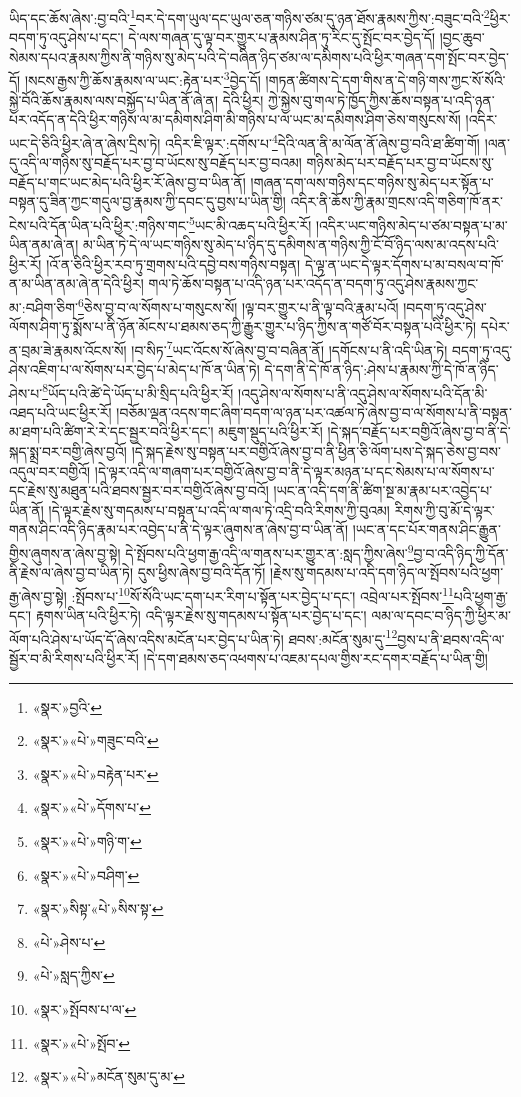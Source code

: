 ཡིད་དང་ཆོས་ཞེས་:བྱ་བའི་\footnote{«སྣར་»བྱའི་}བར་དེ་དག་ཡུལ་དང་ཡུལ་ཅན་གཉིས་ཙམ་དུ་ཉན་ཐོས་རྣམས་ཀྱིས་:བཟུང་བའི་\footnote{«སྣར་»«པེ་»གཟུང་བའི་}ཕྱིར་བདག་ཏུ་འདུ་ཤེས་པ་དང་། དེ་ལས་གཞན་དུ་ལྟ་བར་གྱུར་པ་རྣམས་ཤིན་ཏུ་རིང་དུ་སྤོང་བར་བྱེད་དོ། །བྱང་ཆུབ་སེམས་དཔའ་རྣམས་ཀྱིས་ནི་གཉིས་སུ་མེད་པའི་དེ་བཞིན་ཉིད་ཙམ་ལ་དམིགས་པའི་ཕྱིར་གཞན་དག་སྤོང་བར་བྱེད་དོ། །སངས་རྒྱས་ཀྱི་ཆོས་རྣམས་ལ་ཡང་:རྟེན་པར་\footnote{«སྣར་»«པེ་»བརྟེན་པར་}བྱེད་དོ། །གཏན་ཚིགས་དེ་དག་གིས་ན་དེ་གཉི་གས་ཀྱང་སོ་སོའི་སྐྱེ་བོའི་ཆོས་རྣམས་ལས་བསྐྱོད་པ་ཡིན་ནོ་ཞེ་ན། དེའི་ཕྱིར། ཀྱེ་སྐྱེས་བུ་གལ་ཏེ་ཁྱོད་ཀྱིས་ཆོས་བསྟན་པ་འདི་ཉན་པར་འདོད་ན་དེའི་ཕྱིར་གཉིས་ལ་མ་དམིགས་ཤིག་མི་གཉིས་པ་ལ་ཡང་མ་དམིགས་ཤིག་ཅེས་གསུངས་སོ། །འདིར་ཡང་དེ་ཅིའི་ཕྱིར་ཞེ་ན་ཞེས་དྲིས་ཏེ། འདིར་ཇི་ལྟར་:དགོས་པ་\footnote{«སྣར་»«པེ་»དོགས་པ་}དེའི་ལན་ནི་མ་ལོན་ནོ་ཞེས་བྱ་བའི་ཐ་ཚིག་གོ། །ལན་དུ་འདི་ལ་གཉིས་སུ་བརྗོད་པར་བྱ་བ་ཡོངས་སུ་བརྗོད་པར་བྱ་བའམ། གཉིས་མེད་པར་བརྗོད་པར་བྱ་བ་ཡོངས་སུ་བརྗོད་པ་གང་ཡང་མེད་པའི་ཕྱིར་རོ་ཞེས་བྱ་བ་ཡིན་ནོ། །གཞན་དག་ལས་གཉིས་དང་གཉིས་སུ་མེད་པར་སྟོན་པ་བསྟན་དུ་ཟིན་ཀྱང་གདུལ་བྱ་རྣམས་ཀྱི་དབང་དུ་བྱས་པ་ཡིན་གྱི། འདིར་ནི་ཆོས་ཀྱི་རྣམ་གྲངས་འདི་གཅིག་ཁོ་ནར་ངེས་པའི་དོན་ཡིན་པའི་ཕྱིར་:གཉིས་གང་\footnote{«སྣར་»«པེ་»གཉི་ག་}ཡང་མི་འཆད་པའི་ཕྱིར་རོ། །འདིར་ཡང་གཉིས་མེད་པ་ཙམ་བསྟན་པ་མ་ཡིན་ནམ་ཞེ་ན། མ་ཡིན་ཏེ་དེ་ལ་ཡང་གཉིས་སུ་མེད་པ་ཉིད་དུ་དམིགས་ན་གཉིས་ཀྱི་ངོ་བོ་ཉིད་ལས་མ་འདས་པའི་ཕྱིར་རོ། །འོ་ན་ཅིའི་ཕྱིར་རབ་ཏུ་གྲགས་པའི་དབྱེ་བས་གཉིས་བསྟན། དེ་ལྟ་ན་ཡང་དེ་ལྟར་དོགས་པ་མ་བསལ་བ་ཁོ་ན་མ་ཡིན་ནམ་ཞེ་ན་དེའི་ཕྱིར། གལ་ཏེ་ཆོས་བསྟན་པ་འདི་ཉན་པར་འདོད་ན་བདག་ཏུ་འདུ་ཤེས་རྣམས་ཀྱང་མ་:བཤིག་ཅིག་\footnote{«སྣར་»«པེ་»བཤིག་}ཅེས་བྱ་བ་ལ་སོགས་པ་གསུངས་སོ། །ལྟ་བར་གྱུར་པ་ནི་ལྟ་བའི་རྣམ་པའོ། །བདག་ཏུ་འདུ་ཤེས་ལོགས་ཤིག་ཏུ་སྨོས་པ་ནི་ཉོན་མོངས་པ་ཐམས་ཅད་ཀྱི་རྒྱུར་གྱུར་པ་ཉིད་ཀྱིས་ན་གཙོ་བོར་བསྟན་པའི་ཕྱིར་ཏེ། དཔེར་ན་བྲམ་ཟེ་རྣམས་འོངས་སོ། །བ་སིཏ་\footnote{«སྣར་»སིསྟ་«པེ་»སིས་སྟ་}ཡང་འོངས་སོ་ཞེས་བྱ་བ་བཞིན་ནོ། །དགོངས་པ་ནི་འདི་ཡིན་ཏེ། བདག་ཏུ་འདུ་ཤེས་འཇིག་པ་ལ་སོགས་པར་བྱེད་པ་མེད་པ་ཁོ་ན་ཡིན་ཏེ། དེ་དག་ནི་དེ་ཁོ་ན་ཉིད་:ཤེས་པ་རྣམས་ཀྱི་དེ་ཁོ་ན་ཉིད་ཤེས་པ་\footnote{«པེ་»ཤེས་པ་}ཡོད་པའི་ཚེ་དེ་ཡོད་པ་མི་སྲིད་པའི་ཕྱིར་རོ། །འདུ་ཤེས་ལ་སོགས་པ་ནི་འདུ་ཤེས་ལ་སོགས་པའི་དོན་མི་འཐད་པའི་ཡང་ཕྱིར་རོ། །བཅོམ་ལྡན་འདས་གང་ཞིག་བདག་ལ་ཉན་པར་འཚལ་ཏེ་ཞེས་བྱ་བ་ལ་སོགས་པ་ནི་བསྟན་མ་ཐག་པའི་ཚིག་རེ་རེ་དང་སྦྱར་བའི་ཕྱིར་དང་། མཇུག་སྡུད་པའི་ཕྱིར་རོ། །དེ་སྐད་བརྗོད་པར་བགྱིའོ་ཞེས་བྱ་བ་ནི་དེ་སྐད་སྨྲ་བར་བགྱི་ཞེས་བྱའོ། །དེ་སྐད་རྗེས་སུ་བསྟན་པར་བགྱིའོ་ཞེས་བྱ་བ་ནི་ཕྱིན་ཅི་ལོག་པས་དེ་སྐད་ཅེས་བྱ་བས་འདུལ་བར་བགྱིའོ། །དེ་ལྟར་འདི་ལ་གཞག་པར་བགྱིའོ་ཞེས་བྱ་བ་ནི་དེ་ལྟར་མཉན་པ་དང་སེམས་པ་ལ་སོགས་པ་དང་རྗེས་སུ་མཐུན་པའི་ཐབས་སྦྱར་བར་བགྱིའོ་ཞེས་བྱ་བའོ། །ཡང་ན་འདི་དག་ནི་ཚིག་སྔ་མ་རྣམ་པར་འབྱེད་པ་ཡིན་ནོ། །དེ་ལྟར་རྗེས་སུ་གདམས་པ་བསྟན་པ་འདི་ལ་གལ་ཏེ་འདྲི་བའི་རིགས་ཀྱི་བུའམ། རིགས་ཀྱི་བུ་མོ་དེ་ལྟར་གནས་ཤིང་འདི་ཉིད་རྣམ་པར་འབྱེད་པ་ནི་དེ་ལྟར་ཞུགས་ན་ཞེས་བྱ་བ་ཡིན་ནོ། །ཡང་ན་དང་པོར་གནས་ཤིང་རྒྱུན་གྱིས་ཞུགས་ན་ཞེས་བྱ་སྟེ། དེ་སྤོབས་པའི་ཕྱག་རྒྱ་འདི་ལ་གནས་པར་གྱུར་ན་:སླད་ཀྱིས་ཞེས་\footnote{«པེ་»སླད་ཀྱིས་}བྱ་བ་འདི་ཉིད་ཀྱི་དོན་ནི་རྗེས་ལ་ཞེས་བྱ་བ་ཡིན་ཏེ། དུས་ཕྱིས་ཞེས་བྱ་བའི་དོན་ཏོ། །རྗེས་སུ་གདམས་པ་འདི་དག་ཉིད་ལ་སྤོབས་པའི་ཕྱག་རྒྱ་ཞེས་བྱ་སྟེ། :སྤོབས་པ་\footnote{«སྣར་»སྤོབས་པ་ལ་}སོ་སོའི་ཡང་དག་པར་རིག་པ་སྟོན་པར་བྱེད་པ་དང་། འབྲེལ་པར་སྤོབས་\footnote{«སྣར་»«པེ་»སྤོབ་}པའི་ཕྱག་རྒྱ་དང་། རྟགས་ཡིན་པའི་ཕྱིར་ཏེ། འདི་ལྟར་རྗེས་སུ་གདམས་པ་སྟོན་པར་བྱེད་པ་དང་། ལམ་ལ་དབང་བ་ཉིད་ཀྱི་ཕྱིར་མ་ལོག་པའི་ཤེས་པ་ཡོད་དོ་ཞེས་འདིས་མངོན་པར་བྱེད་པ་ཡིན་ཏེ། ཐབས་:མངོན་སུམ་དུ་\footnote{«སྣར་»«པེ་»མངོན་སུམ་དུ་མ་}བྱས་པ་ནི་ཐབས་འདི་ལ་སྦྱོར་བ་མི་རིགས་པའི་ཕྱིར་རོ། །དེ་དག་ཐམས་ཅད་འཕགས་པ་འཇམ་དཔལ་གྱིས་རང་དགར་བརྗོད་པ་ཡིན་གྱི། 